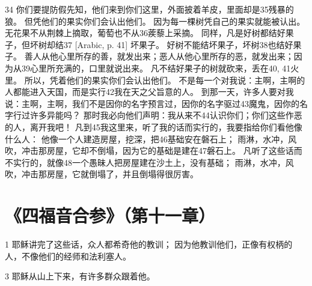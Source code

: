 34  你们要提防假先知，他们来到你们这里，外面披着羊皮，里面却是35残暴的狼。 但凭他们的果实你们会认出他们。 因为每一棵树凭自己的果实就能被认出。无花果不从荆棘上摘取，葡萄也不从36蒺藜上采摘。 同样，凡是好树都结好果子，但坏树却结37 [Arabic, p. 41] 坏果子。 好树不能结坏果子，坏树38也结好果子。 善人从他心里所存的善，就发出来；恶人从他心里所存的恶，就发出来；因为从39心里所充满的，口里就说出来。 凡不结好果子的树就砍来，丢在40, 41火里。 所以，凭着他们的果实你们会认出他们。 不是每一个对我说：主啊，主啊的人都能进入天国，而是实行42我在天之父旨意的人。 到那一天，许多人要对我说：主啊，主啊，我们不是因你的名字预言过，因你的名字驱过43魔鬼，因你的名字行过许多异能吗？ 那时我必向他们声明：我从来不44认识你们；你们这些作恶的人，离开我吧！ 凡到45我这里来，听了我的话而实行的，我要指给你们看他像什么人： 他像一个人建造房屋，挖深，把46基础安在磐石上； 雨淋，水冲，风吹，冲击那房屋，它却不倒塌，因为它的基础是建在47磐石上。 凡听了这些话而不实行的，就像48一个愚昧人把房屋建在沙土上，没有基础； 雨淋，水冲，风吹，冲击那房屋，它就倒塌了，并且倒塌得很厉害。\par



\section{《四福音合参》（第十一章）}

1  耶稣讲完了这些话，众人都希奇他的教训； 因为他教训他们，正像有权柄的人，不像他们的经师和法利塞人。\par

3  耶稣从山上下来，有许多群众跟着他。\par

